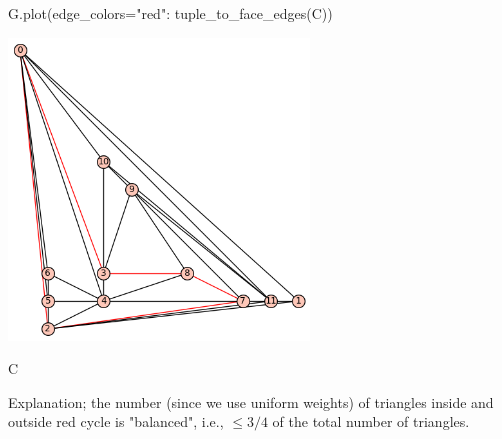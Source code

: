 \begin{sageCell}
    G.plot(edge_colors={"red": tuple_to_face_edges(C)})
\end{sageCell}
\begin{outImage}
    \includegraphics[width=0.6\textwidth]{Images/BalancedSeparators/cycle_separator.png}
\end{outImage}

\begin{sageCell}
    C
\end{sageCell}
\begin{outCell}
    [8, 3, 0, 2, 7]
\end{outCell}
Explanation; the number (since we use uniform weights) of triangles inside and outside red cycle is "balanced", i.e., $\leq 3/4$ of the total number of triangles.
